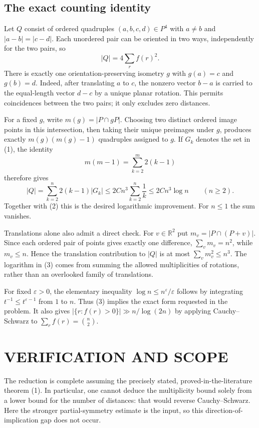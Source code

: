 \subsection{The exact counting identity}
Let $Q$ consist of ordered quadruples $(a,b,c,d)\in P^4$ with $a\ne b$ and $|a-b|=|c-d|$. Each unordered pair can be oriented in two ways, independently for the two pairs, so
\[
|Q|=4\sum_r f(r)^2.
\tag{2}
\]
There is exactly one orientation-preserving isometry $g$ with $g(a)=c$ and $g(b)=d$. Indeed, after translating $a$ to $c$, the nonzero vector $b-a$ is carried to the equal-length vector $d-c$ by a unique planar rotation. This permits coincidences between the two pairs; it only excludes zero distances.

For a fixed $g$, write $m(g)=|P\cap gP|$. Choosing two distinct ordered image points in this intersection, then taking their unique preimages under $g$, produces exactly $m(g)(m(g)-1)$ quadruples assigned to $g$. If $G_k$ denotes the set in (1), the identity
\[
m(m-1)=\sum_{k=2}^{m}2(k-1)
\]
therefore gives
\[
|Q|=\sum_{k=2}^{n}2(k-1)|G_k|
\leq2Cn^3\sum_{k=2}^{n}\frac1k
\leq2Cn^3\log n\qquad(n\geq2).
\tag{3}
\]
Together with (2) this is the desired logarithmic improvement. For $n\leq1$ the sum vanishes.

Translations alone also admit a direct check. For $v\in\mathbb R^2$ put $m_v=|P\cap(P+v)|$. Since each ordered pair of points gives exactly one difference, $\sum_vm_v=n^2$, while $m_v\leq n$. Hence the translation contribution to $|Q|$ is at most $\sum_vm_v^2\leq n^3$. The logarithm in (3) comes from summing the allowed multiplicities of rotations, rather than an overlooked family of translations.

For fixed $\varepsilon>0$, the elementary inequality $\log n\leq n^\varepsilon/\varepsilon$ follows by integrating $t^{-1}\leq t^{\varepsilon-1}$ from $1$ to $n$. Thus (3) implies the exact form requested in the problem. It also gives $|\{r:f(r)>0\}|\gg n/\log(2n)$ by applying Cauchy--Schwarz to $\sum_r f(r)=\binom n2$.

\section{VERIFICATION AND SCOPE}
The reduction is complete assuming the precisely stated, proved-in-the-literature theorem (1). In particular, one cannot deduce the multiplicity bound solely from a lower bound for the number of distances: that would reverse Cauchy--Schwarz. Here the stronger partial-symmetry estimate is the input, so this direction-of-implication gap does not occur.

